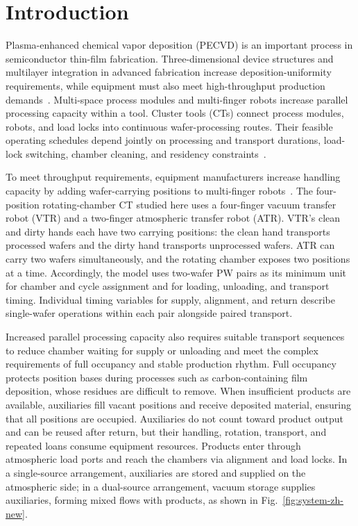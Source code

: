 \documentclass[final,5p,times,twocolumn]{elsarticle}
\begin{document}
\section{Introduction}
Plasma-enhanced chemical vapor deposition (PECVD) is an important process in semiconductor thin-film fabrication. Three-dimensional device structures and multilayer integration in advanced fabrication increase deposition-uniformity requirements, while equipment must also meet high-throughput production demands~\citep{appliedprecisioncvd}. Multi-space process modules and multi-finger robots increase parallel processing capacity within a tool. Cluster tools (CTs) connect process modules, robots, and load locks into continuous wafer-processing routes. Their feasible operating schedules depend jointly on processing and transport durations, load-lock switching, chamber cleaning, and residency constraints~\citep{pan2018survey}.

To meet throughput requirements, equipment manufacturers increase handling capacity by adding wafer-carrying positions to multi-finger robots~\citep{gu2024applied,gu2024multifinger}. The four-position rotating-chamber CT studied here uses a four-finger vacuum transfer robot (VTR) and a two-finger atmospheric transfer robot (ATR). VTR's clean and dirty hands each have two carrying positions: the clean hand transports processed wafers and the dirty hand transports unprocessed wafers. ATR can carry two wafers simultaneously, and the rotating chamber exposes two positions at a time. Accordingly, the model uses two-wafer PW pairs as its minimum unit for chamber and cycle assignment and for loading, unloading, and transport timing. Individual timing variables for supply, alignment, and return describe single-wafer operations within each pair alongside paired transport.

Increased parallel processing capacity also requires suitable transport sequences to reduce chamber waiting for supply or unloading and meet the complex requirements of full occupancy and stable production rhythm. Full occupancy protects position bases during processes such as carbon-containing film deposition, whose residues are difficult to remove. When insufficient products are available, auxiliaries fill vacant positions and receive deposited material, ensuring that all positions are occupied. Auxiliaries do not count toward product output and can be reused after return, but their handling, rotation, transport, and repeated loans consume equipment resources. Products enter through atmospheric load ports and reach the chambers via alignment and load locks. In a single-source arrangement, auxiliaries are stored and supplied on the atmospheric side; in a dual-source arrangement, vacuum storage supplies auxiliaries, forming mixed flows with products, as shown in Fig.~\ref{fig:system-zh-new}.
\end{document}
